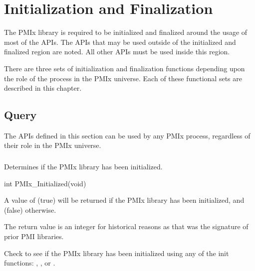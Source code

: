 \chapter{Initialization and Finalization}
\label{chap:api_init}


The \ac{PMIx} library is required to be initialized and finalized around the usage of most of the APIs.
The APIs that may be used outside of the initialized and finalized region are noted.
All other APIs must be used inside this region.

There are three sets of initialization and finalization functions depending upon the role of the process in the PMIx universe.
Each of these functional sets are described in this chapter.


\section{Query}
\label{chap:api_init:general}

The APIs defined in this section can be used by any PMIx process, regardless of their role in the PMIx universe.

\subsection{}

\summary

Determines if the PMIx library has been initialized.

\format

\cspecificstart
\begin{codepar}
int PMIx_Initialized(void)
\end{codepar}
\cspecificend

A value of  (true) will be returned if the PMIx library has been initialized, and  (false) otherwise.

\rationalestart
The return value is an integer for historical reasons as that was the signature of prior PMI libraries.
\rationaleend

\descr

Check to see if the PMIx library has been initialized using any of the init functions:
, , or .

